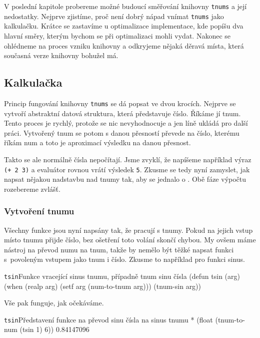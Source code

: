 V poslední kapitole probereme možné budoucí směřování knihovny \texttt{tnums} a její nedostatky. Nejprve zjistíme, proč není dobrý nápad vnímat \texttt{tnums} jako kalkulačku. Krátce se zastavíme u optimalizace implementace, kde popíšu dva hlavní směry, kterým bychom se při optimalizaci mohli vydat. Nakonec se ohlédneme na proces vzniku knihovny a odkryjeme nějaká děravá místa, která současná verze knihovny bohužel má.

\subsection{Kalkulačka}
Princip fungování knihovny \texttt{tnums} se dá popsat ve dvou krocích. Nejprve se vytvoří abstraktní datová struktura, která představuje číslo. Říkáme jí tnum. Tento proces je rychlý, protože se nic nevyhodnocuje a jen líně ukládá pro další práci. Vytvořený tnum se potom s danou přesností převede na číslo, kterému říkám num a toto je aproximací výsledku na danou přesnost.

Takto se ale normálně čísla nepočítají. Jsme zvyklí, že napíšeme například výraz \texttt{(+ 2 3)} a evaluátor rovnou vrátí výsledek \texttt{5}. Zkusme se tedy nyní zamyslet, jak napsat nějakou nadstavbu nad tnumy tak, aby se jednalo o . Obě fáze výpočtu rozebereme zvlášť.

\subsubsection{Vytvoření tnumu}
Všechny funkce jsou nyní napsány tak, že pracují s tnumy. Pokud na jejich vstup místo tnumu přijde číslo, bez ošetření toto volání skončí chybou. My ovšem máme nástroj na převod numu na tnum, takže by nemělo být těžké napsat funkci s~povoleným vstupem jako tnum i číslo. Zkusme to například pro funkci sinus.

\begin{lispcode}{\texttt{tsin}}{Funkce vracející sinus tnumu, případně tnum sinu čísla}
(\textcolor{funkcionalni}{defun} \textcolor{pojmenovan}{tsin} (arg)
  (\textcolor{funkcionalni}{when} (\textcolor{matematicke}{realp} arg)
    (\textcolor{vedlejsi}{setf} arg (\textcolor{moje}{num-to-tnum} arg)))
  (\textcolor{moje}{tnum-sin} arg))
\end{lispcode}

Vše pak funguje, jak očekáváme.

\begin{lisptest}{\texttt{tsin}}{Představení funkce na převod sinu čísla na sinus tnumu}
* (float (tnum-to-num (tsin 1) 6))
0.84147096
\end{lisptest}

